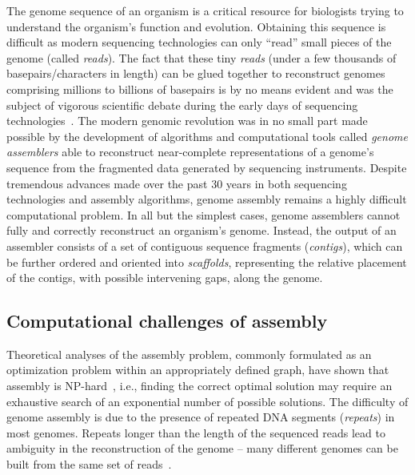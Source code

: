 \documentclass[12pt,\mydriver]{thesis}
\begin{document}
The genome sequence of an organism is a critical resource for
biologists trying to understand the organism's function and
evolution.  Obtaining this sequence is difficult as modern sequencing
technologies can only ``read'' small pieces of the genome (called
\emph{reads}).  The fact that these tiny \emph{reads} (under a few
thousands of basepairs/characters in length) can be glued together to reconstruct genomes
comprising millions to billions of basepairs is by no means evident
and was the subject of vigorous scientific debate during the early
days of sequencing technologies~\cite{green1997against,weber1997human}. The modern genomic revolution was in no small part made
possible by the development of algorithms and computational tools called
\emph{genome assemblers} able to reconstruct near-complete
representations of a genome's sequence from the fragmented data
generated by sequencing instruments.  Despite tremendous advances made
over the past 30 years in both sequencing technologies and assembly
algorithms, genome assembly remains a highly difficult computational
problem.  In all but the simplest cases, genome assemblers cannot
fully and correctly reconstruct an organism's genome.  Instead, the
output of an assembler consists of a set of contiguous sequence
fragments (\emph{contigs}), which can be further ordered and oriented
into \emph{scaffolds}, representing the relative placement of the
contigs, with possible intervening gaps, along the genome.



\subsection{Computational challenges of assembly}

Theoretical analyses of the assembly problem, commonly formulated as
an optimization problem within an appropriately defined graph, have
shown that assembly is
NP-hard~\cite{myers1995,medvedev2007computability}, i.e., finding the
correct optimal solution may require an exhaustive search of an
exponential number of possible solutions.  The difficulty of genome
assembly is due to the presence of repeated DNA
segments (\emph{repeats}) in most genomes. Repeats longer than the length of the sequenced reads lead to ambiguity in the reconstruction of the genome
-- many different genomes can be built from the same set of
reads~\cite{nagarajan2009complexity,kingsford2010assembly}.
\end{document}
